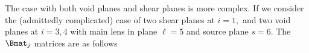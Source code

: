 The case with both void planes and shear planes is more complex. If we consider the (admittedly complicated) case of two shear planes at $i = 1,$ and two void planes at $i = 3,4$ with main lens in plane $\ell = 5$ and source plane $s = 6$. The $\Bmat_j$ matrices are as follows